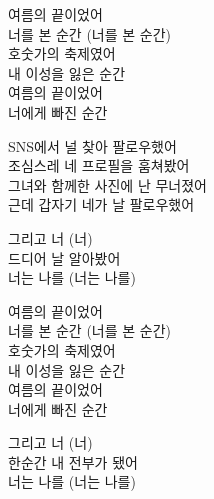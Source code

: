 \begin{lyrics}
\begin{korean}
여름의 끝이었어\\
너를 본 순간 (너를 본 순간)\\
호숫가의 축제였어\\
내 이성을 잃은 순간\\
여름의 끝이었어\\
너에게 빠진 순간
\end{korean}

\begin{korean}
SNS에서 널 찾아 팔로우했어\\
조심스레 네 프로필을 훔쳐봤어\\
그녀와 함께한 사진에 난 무너졌어\\
근데 갑자기 네가 날 팔로우했어
\end{korean}

\begin{korean}
그리고 너 (너)\\
드디어 날 알아봤어\\
너는 나를 (너는 나를)
\end{korean}

\begin{korean}
여름의 끝이었어\\
너를 본 순간 (너를 본 순간)\\
호숫가의 축제였어\\
내 이성을 잃은 순간\\
여름의 끝이었어\\
너에게 빠진 순간
\end{korean}

\begin{korean}
그리고 너 (너)\\
한순간 내 전부가 됐어\\
너는 나를 (너는 나를)
\end{korean}
\end{lyrics}

